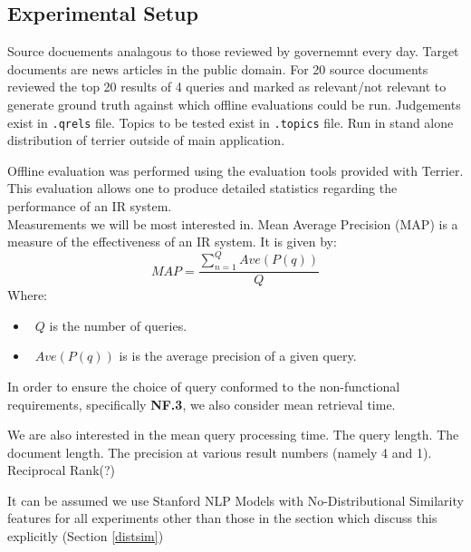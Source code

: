\documentclass{l4proj}
\newcommand{\code}[1]{\texttt{#1}}
\begin{document}
\subsection{Experimental Setup}
Source docuements analagous to those reviewed by governemnt every day.
Target documents are news articles in the public domain.
For 20 source documents reviewed the top 20 results of 4 queries and marked as relevant/not relevant to generate ground truth against which offline evaluations could be run.
Judgements exist in \code{.qrels} file.
Topics to be tested exist in \code{.topics} file.
Run in stand alone distribution of terrier outside of main application.

Offline evaluation was performed using the evaluation tools provided with Terrier. This evaluation allows one to produce detailed statistics regarding the performance of an IR system.\\

Measurements we will be most interested in.
Mean Average Precision (MAP) is a measure of the effectiveness of an IR system.
It is given by:
\begin{displaymath}
  MAP=\frac{\sum_{n=1}^{Q} Ave(P(q))}{Q}
\end{displaymath}
Where: 
\begin{itemize}
\item{~$Q$ is the number of queries.}
\item{~$Ave(P(q))$ is is the average precision of a given query.}
\end{itemize}

In order to ensure the choice of query conformed to the non-functional requirements, specifically \textbf{NF.3}, we also consider mean retrieval time.

We are also interested in the mean query processing time.
The query length.
The document length.
The precision at various result numbers (namely 4 and 1).
Reciprocal Rank(?)

It can be assumed we use Stanford NLP Models with No-Distributional Similarity features for all experiments other than those in the section which discuss this explicitly (Section \ref{distsim})
\end{document}
